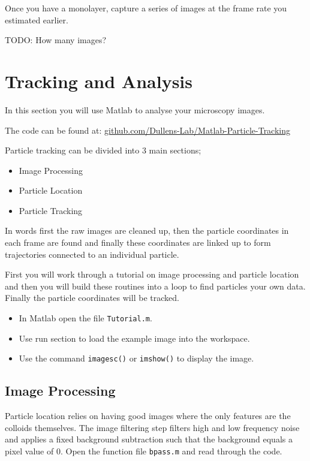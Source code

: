 \documentclass[12pt,a4paper,twoside]{article}
\begin{document}
Once you have a monolayer, capture a series of images at the frame rate you estimated earlier.

TODO: How many images?

\newpage
\section{Tracking and Analysis}

In this section you will use Matlab to analyse your microscopy images. 

The code can be found at: \href{github.com/Dullens-Lab/Matlab-Particle-Tracking}{github.com/Dullens-Lab/Matlab-Particle-Tracking}

Particle tracking can be divided into 3 main sections;

\begin{itemize}
    \item Image Processing
    \item Particle Location
    \item Particle Tracking
\end{itemize}

In words first the raw images are cleaned up, then the particle coordinates in each frame are found and finally these coordinates are linked up to form trajectories connected to an individual particle.

First you will work through a tutorial on image processing and particle location and then you will build these routines into a loop to find particles your own data. Finally the particle coordinates will be tracked.

\begin{itemize}
    \item In Matlab open the file \lstinline{Tutorial.m}.
    \item Use run section to load the example image into the workspace.
    \item Use the command \lstinline{imagesc()} or \lstinline{imshow()} to display the image.
\end{itemize}

\subsection{Image Processing}

Particle location relies on having good images where the only features are the colloids themselves. The image filtering step filters high and low frequency noise and applies a fixed background subtraction such that the background equals a pixel value of $0$. Open the function file \lstinline{bpass.m} and read through the code.
\end{document}

